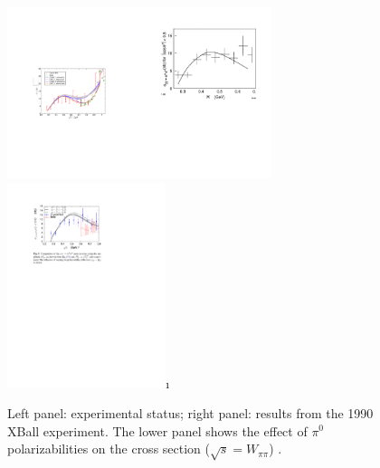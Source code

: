 \begin{figure}[ht]
\begin{center}
\includegraphics[height=5cm,angle=0]{figures/Fig-TP-2pr.pdf}\includegraphics[height=5cm,angle=0]{figures/XBall.pdf}\\
\includegraphics[height=6cm,angle=0]{figures/Fig-TP-5.pdf}\i
\end{center}
\caption{Left panel: experimental status; right panel: results from the 1990 XBall experiment. The lower panel shows the effect of $\pi^0$ polarizabilities on the cross section ($\sqrt{s}=W_{\pi\pi}$) \cite{Moussallam:2013una} .
\label{fig:previousdata}}
\end{figure}

